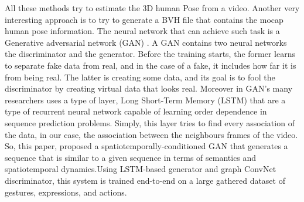 All these methods try to estimate the 3D human Pose from a video. Another very interesting approach is to try to generate a BVH file that contains the mocap human pose information. The neural network that can achieve such task is a Generative adversarial network (GAN) \cite{ANIMGAN}. A GAN contains two neural networks the discriminator and the generator. Before the training starts, the former learns to separate fake data from real, and in the case of a fake, it includes how far it is from being real. The latter is creating some data, and its goal is to fool the discriminator by creating virtual data that looks real. Moreover in GAN's many researchers uses a type of layer, Long Short-Term Memory (LSTM) that are a type of recurrent neural network capable of learning order dependence in sequence prediction problems. Simply, this layer tries to find every association of the data, in our case, the association between the neighbours frames of the video. So, this paper, proposed a spatiotemporally-conditioned
GAN that generates a sequence that is similar to a given sequence in terms of semantics and spatiotemporal dynamics.Using LSTM-based generator and graph ConvNet discriminator, this system is trained end-to-end on a large gathered dataset of gestures, expressions, and actions.